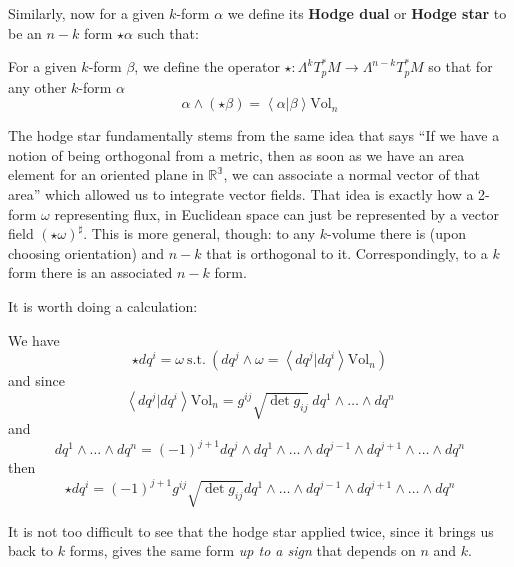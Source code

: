 	Similarly, now for a given $k$-form $\alpha$ we define its \textbf{Hodge dual} or \textbf{Hodge star} to be an $n-k$ form $\star \alpha$ such that:
	\begin{defn}
		For a given $k$-form $\beta$, we define the operator $\star: \Lambda^k T_p^*M \rightarrow \Lambda^{n-k} T_p^*M$ so that for any other $k$-form $\alpha$
		\begin{equation}
			\alpha \wedge (\star \beta) = \left< \alpha | \beta \right> \mathrm{Vol}_n
		\end{equation}
	\end{defn}
	
	The hodge star fundamentally stems from the same idea that says ``If we have a notion of being orthogonal from a metric, then as soon as we have an area element for an oriented plane in $\mathbb{R^3}$, we can associate a normal vector of that area'' which allowed us to integrate vector fields. That idea is exactly how a 2-form $\omega$ representing flux, in Euclidean space can just be represented by a vector field $(\star \omega)^\sharp$. This is more general, though: to any $k$-volume there is (upon choosing orientation) and $n-k$ that is orthogonal to it. Correspondingly, to a $k$ form there is an associated $n-k$ form. 
	
	It is worth doing a calculation:
	\begin{obs}
		We have
		\begin{equation}
			\star dq^i = \omega~\mathrm{ s.t. }~ (dq^j \wedge \omega = \left<dq^j |  dq^i \right> \mathrm{Vol}_n )
		\end{equation}
		and since
		\begin{equation}
			\left<dq^j |  dq^i \right> \mathrm{Vol}_n  = g^{ij} \sqrt{\det g_{ij}} ~ dq^1 \wedge \dots \wedge dq^n
		\end{equation}
		and
		\begin{equation}
			dq^1 \wedge \dots \wedge dq^n = (-1)^{j+1} dq^j \wedge dq^1 \wedge \dots \wedge dq^{j-1} \wedge dq^{j+1} \wedge \dots \wedge dq^n
		\end{equation}
		then
		\begin{equation}
			\star dq^i = (-1)^{j+1} g^{ij} \sqrt{\det g_{ij}} dq^1 \wedge \dots \wedge dq^{j-1} \wedge dq^{j+1} \wedge \dots \wedge dq^n
		\end{equation}
	\end{obs}
	 
	 It is not too difficult to see that the hodge star applied twice, since it brings us back to $k$ forms, gives the same form \emph{up to a sign} that depends on $n$ and $k$. 
	 
